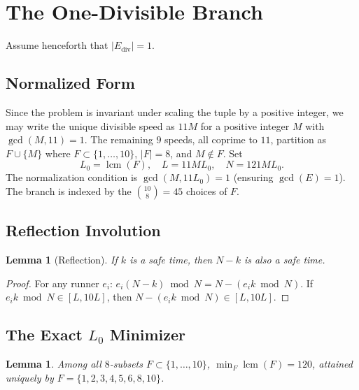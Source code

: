 \documentclass[11pt]{article}
\newtheorem{lemma}[theorem]{Lemma}
\theoremstyle{definition}
\newcommand{\Ediv}{E_{\mathrm{div}}}
\newcommand{\lcm}{\operatorname{lcm}}
\begin{document}
\section{The One-Divisible Branch}
\label{sec:onediv}

Assume henceforth that $|\Ediv| = 1$.

\subsection{Normalized Form}
\label{sec:normalization}

Since the problem is invariant under scaling the tuple by a positive
integer, we may write the unique divisible speed as $11M$ for a positive
integer $M$ with $\gcd(M, 11) = 1$.
The remaining $9$ speeds, all coprime to $11$, partition as
$F \cup \{M\}$ where $F \subset \{1,\ldots,10\}$, $|F| = 8$, and
$M \notin F$.
Set
\[
  L_0 = \lcm(F), \quad
  L = 11 M L_0, \quad
  N = 121 M L_0.
\]
The normalization condition is $\gcd(M, 11 L_0) = 1$ (ensuring
$\gcd(E) = 1$).
The branch is indexed by the $\binom{10}{8} = 45$ choices of $F$.

\subsection{Reflection Involution}
\label{sec:reflection}

\begin{lemma}[Reflection]
  \label{lem:reflection}
  If $k$ is a safe time, then $N - k$ is also a safe time.
\end{lemma}

\begin{proof}
  For any runner $e_i$: $e_i(N-k) \bmod N = N - (e_i k \bmod N)$.
  If $e_i k \bmod N \in [L, 10L]$, then
  $N - (e_i k \bmod N) \in [L, 10L]$.
\end{proof}

\subsection{The Exact $L_0$ Minimizer}
\label{sec:minimizer}

\begin{lemma}
  \label{lem:l0min}
  Among all $8$-subsets $F \subset \{1,\ldots,10\}$,
  $\min_F \lcm(F) = 120$,
  attained uniquely by $F = \{1,2,3,4,5,6,8,10\}$.
\end{lemma}
\end{document}
